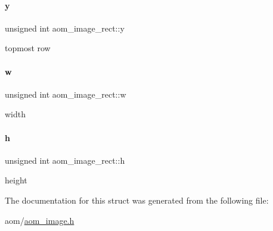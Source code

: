 \paragraph{\texorpdfstring{y}{y}}
{\footnotesize\ttfamily unsigned int aom\+\_\+image\+\_\+rect\+::y}

topmost row \mbox{\label{structaom__image__rect_aed38fa7222f10a140eded2293da8df10}} 
\paragraph{\texorpdfstring{w}{w}}
{\footnotesize\ttfamily unsigned int aom\+\_\+image\+\_\+rect\+::w}

width \mbox{\label{structaom__image__rect_aa018a037ad51dc1ed6e3208e66ba1ca3}} 
\paragraph{\texorpdfstring{h}{h}}
{\footnotesize\ttfamily unsigned int aom\+\_\+image\+\_\+rect\+::h}

height 

The documentation for this struct was generated from the following file\+:\begin{DoxyCompactItemize}
\item 
aom/\hyperlink{aom__image_8h}{aom\+\_\+image.\+h}\end{DoxyCompactItemize}
